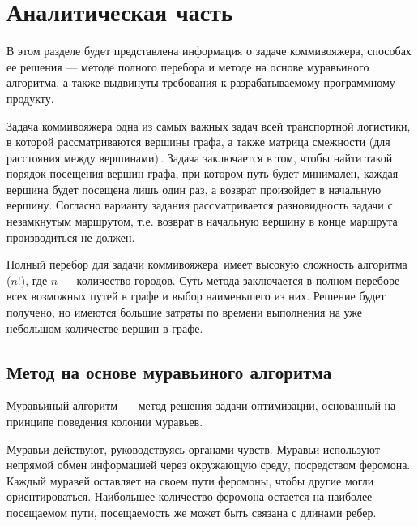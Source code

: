 \chapter{Аналитическая часть}

В этом разделе будет представлена информация о задаче коммивояжера, способах ее решения --- методе полного перебора и методе на основе муравьиного алгоритма, а также выдвинуты требования к разрабатываемому программному продукту.

Задача коммивояжера одна из самых важных задач всей транспортной логистики, в которой рассматриваются вершины графа, а также матрица смежности (для расстояния между вершинами)\,\cite{task}. 
Задача заключается в том, чтобы найти такой порядок посещения вершин графа, при котором путь будет минимален, каждая вершина будет посещена лишь один раз, а возврат произойдет в начальную вершину. Согласно варианту задания рассматривается разновидность задачи с незамкнутым маршрутом, т.е. возврат в начальную вершину в конце маршрута производиться не должен.


Полный перебор для задачи коммивояжера\,\cite{full-comb} имеет высокую сложность алгоритма ($n!$), где $n$ --- количество городов. 
Суть метода заключается в полном переборе всех возможных путей в графе и выбор наименьшего из них. 
Решение будет получено, но имеются большие затраты по времени выполнения на уже небольшом количестве вершин в графе.

\section{Метод на основе муравьиного алгоритма}

Муравьиный алгоритм\,\cite{full-comb} --- метод решения задачи оптимизации, основанный на принципе поведения колонии муравьев.

Муравьи действуют, руководствуясь органами чувств. 
Муравьи используют непрямой обмен информацией через окружающую среду, посредством феромона.
Каждый муравей оставляет на своем пути феромоны, чтобы другие могли ориентироваться. 
Наибольшее количество феромона остается на наиболее посещаемом пути, посещаемость же может быть связана с длинами ребер.

